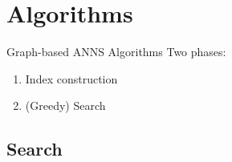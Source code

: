 \section{Algorithms}

\begin{frame}{Graph-based ANNS Algorithms}
    Two phases:
    \begin{enumerate}
        \item Index construction
        \item (Greedy) Search 
    \end{enumerate}
\end{frame}

\subsection{Search}

